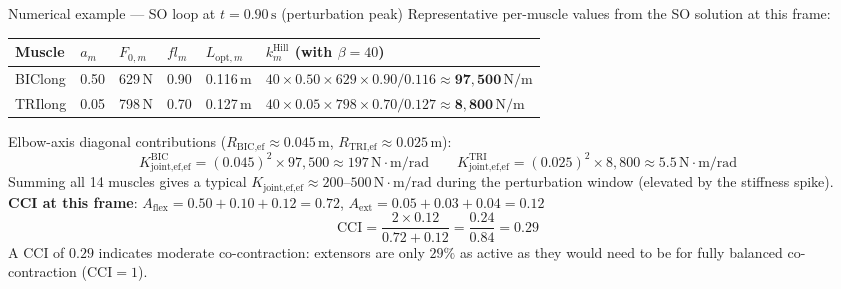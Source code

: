 \documentclass[11pt,a4paper]{article}
\begin{document}
\begin{notebox}[PipeBlue]{Numerical example --- SO loop at $t=0.90\,\text{s}$ (perturbation peak)}
Representative per-muscle values from the SO solution at this frame:
\begin{center}\small
\begin{tabular}{llllll}
\toprule
Muscle & $a_m$ & $F_{0,m}$ & $fl_m$ & $L_{\text{opt},m}$ & $k_m^{\text{Hill}}$ (\textbf{with} $\beta=40$) \\
\midrule
\rowcolor{LightBlue}
BIClong & 0.50 & 629\,N & 0.90 & 0.116\,m &
  $40\times0.50\times629\times0.90/0.116\approx\mathbf{97{,}500}\,\text{N/m}$ \\
TRIlong & 0.05 & 798\,N & 0.70 & 0.127\,m &
  $40\times0.05\times798\times0.70/0.127\approx\mathbf{8{,}800}\,\text{N/m}$ \\
\bottomrule
\end{tabular}
\end{center}
Elbow-axis diagonal contributions
($R_\text{BIC,ef}\approx0.045\,\text{m}$, $R_\text{TRI,ef}\approx0.025\,\text{m}$):
\[
K_\text{joint,ef,ef}^{\text{BIC}} = (0.045)^2\times97{,}500 \approx 197\,\text{N}{\cdot}\text{m/rad}
\qquad
K_\text{joint,ef,ef}^{\text{TRI}} = (0.025)^2\times8{,}800 \approx 5.5\,\text{N}{\cdot}\text{m/rad}
\]
Summing all 14 muscles gives a typical $K_\text{joint,ef,ef}\approx200\text{--}500\,\text{N}{\cdot}\text{m/rad}$
during the perturbation window (elevated by the stiffness spike).\\[4pt]
\textbf{CCI at this frame}:
$A_\text{flex}=0.50+0.10+0.12=0.72$, $A_\text{ext}=0.05+0.03+0.04=0.12$
\[
\text{CCI} = \frac{2\times0.12}{0.72+0.12} = \frac{0.24}{0.84} = \mathbf{0.29}
\]
A CCI of $0.29$ indicates moderate co-contraction: extensors are only $29\%$
as active as they would need to be for fully balanced co-contraction ($\text{CCI}=1$).
\end{notebox}
\end{document}
